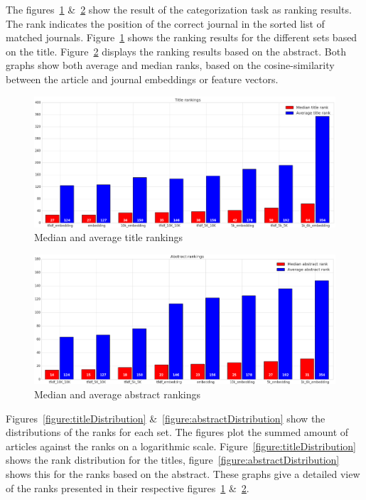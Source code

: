\documentclass[../../Thesis.tex]{subfiles}
\begin{document}
The figures~\ref{figure:titleRanks} \&~\ref{figure:abstractRanks} show the result of the categorization task as ranking results. The rank indicates the position of the correct journal in the sorted list of matched journals. Figure~\ref{figure:titleRanks} shows the ranking results for the different sets based on the title. Figure~\ref{figure:abstractRanks} displays the ranking results based on the abstract. Both graphs show both average and median ranks, based on the cosine-similarity between the article and journal embeddings or feature vectors.\\
\begin{figure}[hbt]
\includegraphics[width=6.5in]{Plots/Title_rankings}
\caption{Median and average title rankings}\label{figure:titleRanks}
\end{figure}
\begin{figure}[hbt]
\includegraphics[width=6.5in]{Plots/Abstract_rankings}
\caption{Median and average abstract rankings}\label{figure:abstractRanks}
\end{figure}
\clearpage
{}
Figures~\ref{figure:titleDistribution} \&~\ref{figure:abstractDistribution} show the distributions of the ranks for each set. The figures plot the summed amount of articles against the ranks on a logarithmic scale. Figure~\ref{figure:titleDistribution} shows the rank distribution for the titles, figure~\ref{figure:abstractDistribution} shows this for the ranks based on the abstract. These graphs give a detailed view of the ranks presented in their respective figures~\ref{figure:titleRanks} \&~\ref{figure:abstractRanks}.
\end{document}
